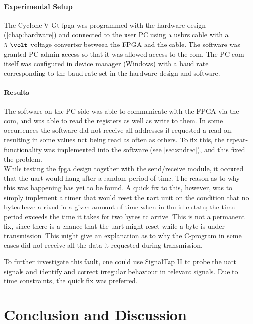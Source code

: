 \documentclass[main.tex]{subfiles}
\begin{document}
\subsubsection{Experimental Setup}

The Cyclone V Gt \gls{fpga} was programmed with the hardware design (\ref{chap:hardware}) and connected to the user PC using a \gls{usbrs} cable with a $5~\volt$ voltage converter between the FPGA and the cable. The software was granted PC admin access so that it was allowed access to the \gls{com}. The PC \gls{com} itself was configured in device manager (Windows) with a baud rate corresponding to the baud rate set in the hardware design and software. 

\subsubsection{Results}

The software on the PC side was able to communicate with the FPGA via the \gls{com}, and was able to read the registers as well as write to them. In some occurrences the software did not receive all addresses it requested a read on, resulting in some values not being read as often as others. To fix this, the repeat-functionality was implemented into the software (see \ref{sec:sndrec}), and this fixed the problem.\\

While testing the \gls{fpga} design together with the send/receive module, it occured that the \gls{uart} would hang after a random period of time. The reason as to why this was happening has yet to be found. A quick fix to this, however, was to simply implement a timer that would reset the \gls{uart} unit on the condition that no bytes have arrived in a given amount of time when in the idle state; the time period exceeds the time it takes for two bytes to arrive. This is not a permanent fix, since there is a chance that the \gls{uart} might reset while a byte is under transmission. This might give an explanation as to why the C-program in some cases did not receive all the data it requested during transmission.

To further investigate this fault, one could use SignalTap II to probe the \gls{uart} signals and identify and correct irregular behaviour in relevant signals. Due to time constraints, the quick fix was preferred.

\chapter{Conclusion and Discussion}
\end{document}
